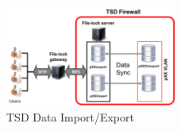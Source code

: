 \begin{figure}[htbp]
	\centering
	\includegraphics[width=0.5\textwidth]{figures/file-lock}                
	\caption{TSD Data Import/Export}
	\label{fig:file-lock}
\end{figure}
